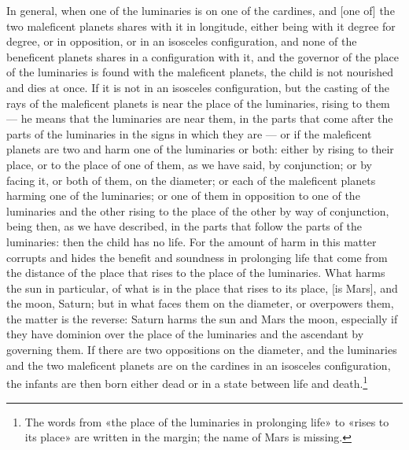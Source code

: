 \documentclass[11pt]{article}
\newcommand{\Fol}[1]{\marginpar{\footnotesize\color{gray}f.\,#1}}
\begin{document}
\par \Fol{43v}In general, when one of the luminaries is on one of the cardines, and [one of] the two maleficent planets shares with it in longitude, either being with it degree for degree, or in opposition, or in an isosceles configuration, and none of the beneficent planets shares in a configuration with it, and the governor of the place of the luminaries is found with the maleficent planets, the child is not nourished and dies at once. If it is not in an isosceles configuration, but the casting of the rays of the maleficent planets is near the place of the luminaries, rising to them — he means that the luminaries are near them, in the parts that come after the parts of the luminaries in the signs in which they are — or if the maleficent planets are two and harm one of the luminaries or both: either by rising to their place, or to the place of one of them, as we have said, by conjunction; or by facing it, or both of them, on the diameter; or each of the maleficent planets harming one of the luminaries; or one of them in opposition to one of the luminaries and the other rising to the place of the other by way of conjunction, being then, as we have described, in the parts that follow the parts of the luminaries: then the child has no life. For the amount of harm in this matter corrupts and hides the benefit and soundness in prolonging life that come from the distance of the place that rises to the place of the luminaries. What harms the sun in particular, of what is in the place that rises to its place, [is Mars], and the moon, Saturn; but in what faces them on the diameter, or overpowers them, the matter is the reverse: Saturn harms the sun and Mars the moon, especially if they have dominion over the place of the luminaries and the ascendant by governing them. If there are two oppositions on the diameter, and the luminaries and the two maleficent planets are on the cardines in an isosceles configuration, the infants are then born either dead or in a state between life and death.\footnote{The words from «the place of the luminaries in prolonging life» to «rises to its place» are written in the margin; the name of Mars is missing.}\par
\end{document}
